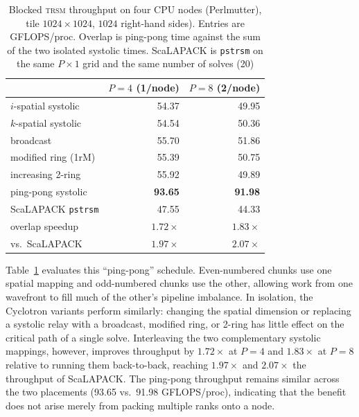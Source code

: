 \documentclass[sigplan, nonacm]{acmart}
\begin{document}

\begin{table}[t]
\centering
\caption{Blocked \textsc{trsm} throughput on four CPU nodes
(Perlmutter), tile $1024\times1024$, $1024$ right-hand sides).
Entries are GFLOPS/proc. Overlap is ping-pong time against the sum of the
two isolated systolic times. ScaLAPACK is \texttt{pstrsm} on the same
$P{\times}1$ grid and the same number of solves (20)}
\label{tab:trsm-pingpong}
\small
\begin{tabular}{@{}l r r@{}}
\toprule
 & $P=4$ (1/node) & $P=8$ (2/node) \\
\midrule
$i$-spatial systolic & 54.37 & 49.95 \\
$k$-spatial systolic & 54.54 & 50.36 \\
broadcast & 55.70 & 51.86 \\
modified ring (1rM) & 55.39 & 50.75 \\
increasing 2-ring & 55.92 & 49.89 \\
ping-pong systolic & \textbf{93.65} & \textbf{91.98} \\
ScaLAPACK \texttt{pstrsm} & 47.55 & 44.33 \\
\midrule
overlap speedup & $1.72\times$  & $1.83\times$ \\
vs.\ ScaLAPACK & $1.97\times$ & $2.07\times$ \\
\bottomrule
\end{tabular}
\end{table}


Table~\ref{tab:trsm-pingpong} evaluates this ``ping-pong'' schedule. Even-numbered chunks use one spatial mapping and odd-numbered chunks use the other, allowing work from one wavefront to fill much of the other's pipeline imbalance. In isolation, the Cyclotron variants perform similarly: changing the spatial dimension or replacing a systolic relay with a broadcast, modified ring, or 2-ring has little effect on the critical path of a single solve. Interleaving the two complementary systolic mappings, however, improves throughput by \(1.72\times\) at \(P=4\) and \(1.83\times\) at \(P=8\) relative to running them back-to-back, reaching \(1.97\times\) and \(2.07\times\) the throughput of ScaLAPACK. The ping-pong throughput remains similar across the two placements (93.65 vs.\ 91.98 GFLOPS/proc), indicating that the benefit does not arise merely from packing multiple ranks onto a node.
\end{document}

